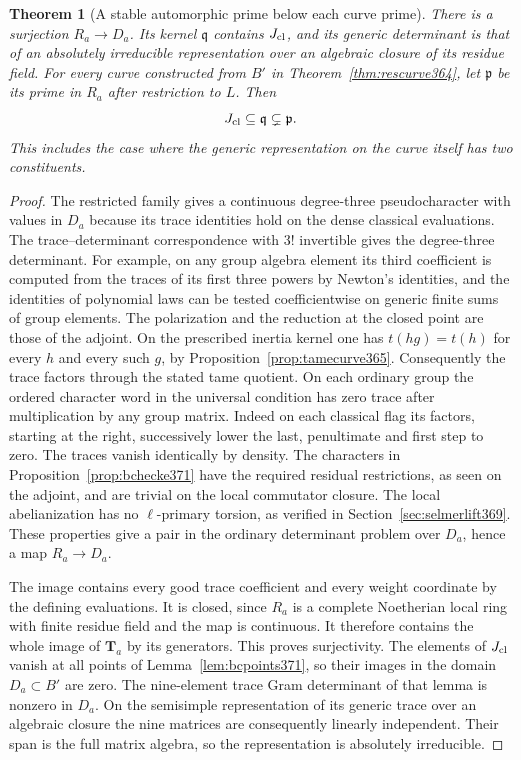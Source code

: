 \documentclass[a4paper,11pt]{article}
\newtheorem{theorem}[proposition]{Theorem}
\theoremstyle{definition}
\theoremstyle{remark}
\numberwithin{equation}{section}
\begin{document}
\begin{theorem}[A stable automorphic prime below each curve prime]
\label{thm:stableprime371}
There is a surjection \(R_a\to D_a\). Its kernel
\(\mathfrak q\) contains \(J_{\rm cl}\), and its generic
determinant is that of an absolutely irreducible representation
over an algebraic closure of its residue field. For every
curve constructed from \(B'\) in Theorem~\ref{thm:rescurve364},
let \(\mathfrak p\) be its prime in \(R_a\) after restriction
to \(L\). Then
\[
                   J_{\rm cl}\subseteq\mathfrak q
                          \subsetneq\mathfrak p .
\]
This includes the case where the generic representation on
the curve itself has two constituents.
\end{theorem}
\begin{proof}
The restricted family gives a continuous degree-three
pseudocharacter with values in \(D_a\) because its trace
identities hold on the dense classical evaluations. The
trace--determinant correspondence with \(3!\) invertible
gives the degree-three determinant. For example, on any
group algebra element its third coefficient is computed from
the traces of its first three powers by Newton's identities,
and the identities of polynomial laws can be tested
coefficientwise on generic finite sums of group elements.
The polarization and the reduction at the closed point
are those of the adjoint. On the prescribed inertia kernel
one has \(t(hg)=t(h)\) for every \(h\) and every such \(g\),
by Proposition~\ref{prop:tamecurve365}. Consequently the
trace factors through the stated tame quotient. On each
ordinary group the ordered character word in the universal
condition has zero trace after multiplication by any group
matrix. Indeed on each classical flag its factors, starting
at the right, successively lower the last, penultimate and
first step to zero. The traces vanish identically by density.
The characters in Proposition~\ref{prop:bchecke371}
have the required residual restrictions, as seen on the
adjoint, and are trivial on the local commutator closure.
The local abelianization has no \(\ell\)-primary torsion,
as verified in Section~\ref{sec:selmerlift369}. These
properties give a pair in the ordinary determinant problem
over \(D_a\), hence a map \(R_a\to D_a\).~\cite{VII-V-chenevier364}

The image contains every good trace coefficient and every
weight coordinate by the defining evaluations. It is closed,
since \(R_a\) is a complete Noetherian local ring with finite
residue field and the map is continuous. It therefore contains
the whole image of \(\mathbf T_a\) by its generators. This
proves surjectivity. The elements of \(J_{\rm cl}\) vanish
at all points of Lemma~\ref{lem:bcpoints371}, so their images
in the domain \(D_a\subset B'\) are zero. The nine-element
trace Gram determinant of that lemma is nonzero in \(D_a\).
On the semisimple representation of its generic trace over
an algebraic closure the nine matrices are consequently
linearly independent. Their span is the full matrix algebra,
so the representation is absolutely irreducible.


\end{proof}
\end{document}
